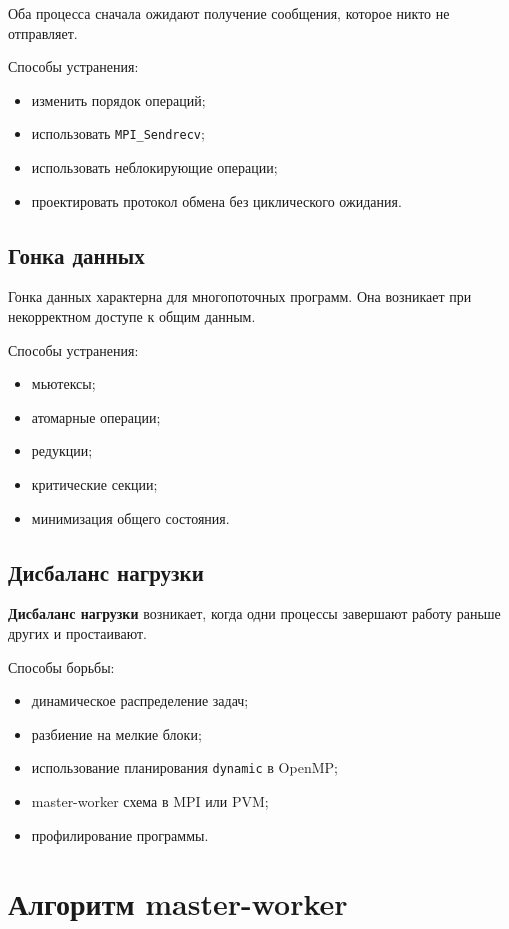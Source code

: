 \documentclass[12pt,a4paper]{article}
\begin{document}
Оба процесса сначала ожидают получение сообщения, которое никто не отправляет.

Способы устранения:
\begin{itemize}
    \item изменить порядок операций;
    \item использовать \texttt{MPI\_Sendrecv};
    \item использовать неблокирующие операции;
    \item проектировать протокол обмена без циклического ожидания.
\end{itemize}

\subsection{Гонка данных}

Гонка данных характерна для многопоточных программ. Она возникает при некорректном доступе к общим данным.

Способы устранения:
\begin{itemize}
    \item мьютексы;
    \item атомарные операции;
    \item редукции;
    \item критические секции;
    \item минимизация общего состояния.
\end{itemize}

\subsection{Дисбаланс нагрузки}

\textbf{Дисбаланс нагрузки} возникает, когда одни процессы завершают работу раньше других и простаивают.

Способы борьбы:
\begin{itemize}
    \item динамическое распределение задач;
    \item разбиение на мелкие блоки;
    \item использование планирования \texttt{dynamic} в OpenMP;
    \item master-worker схема в MPI или PVM;
    \item профилирование программы.
\end{itemize}

\section{Алгоритм master-worker}
\end{document}
